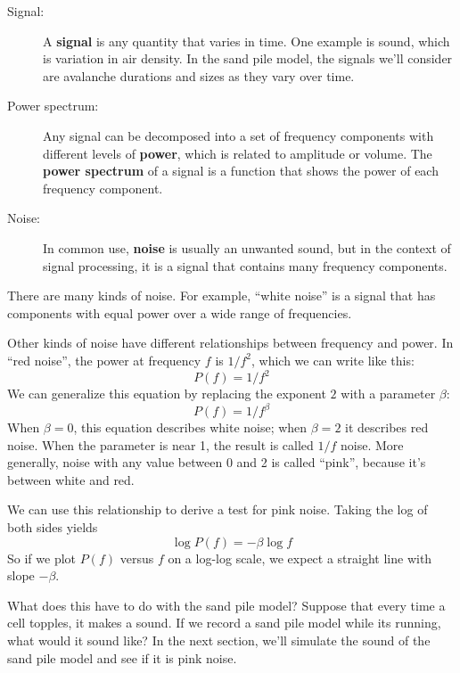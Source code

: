 \documentclass[12pt]{book}
\theoremstyle{exercise}
\begin{document}
\begin{description}

\item[Signal:] A {\bf signal} is any quantity that varies in time.
  One example is sound, which is variation in air density.  In the sand pile model, the signals we'll consider are avalanche durations and sizes as they vary over time.

\item[Power spectrum:] Any signal can be decomposed into a set of frequency components with different levels of {\bf power}, which is related to amplitude or volume.  The {\bf power spectrum} of a signal is a function that shows the power of each frequency component.

\item[Noise:] In common use, {\bf noise} is usually an unwanted sound,
but in the context of signal processing, it is a signal that
contains many frequency components.

\end{description}

There are many kinds of noise.  For example, ``white noise'' is a
signal that has components with equal power over a wide range of
frequencies.


Other kinds of noise have different relationships between frequency
and power.  In ``red noise'', the power at frequency $f$ is
$1/f^2$, which we can write like this:
%
\[ P(f) = 1/f^2 \]
%
We can generalize this equation by replacing the exponent $2$ with
a parameter $\beta$:
%
\[ P(f) = 1/f^\beta \]
%
When $\beta=0$, this equation describes white noise; when $\beta=2$ it
describes red noise.  When the parameter is near 1, the result is called
$1/f$ noise.  More generally, noise with any value between 0 and 2
is called ``pink'', because it's between white and red.


We can use this relationship to derive a test for pink noise.
Taking the log of both sides yields
%
\[ \log P(f) = -\beta \log f \]
%
So if we plot $P(f)$ versus $f$ on a log-log scale, we
expect a straight line with slope $-\beta$.

What does this have to do with the sand pile model?  Suppose that every time
a cell topples, it makes a sound.  If we record a sand pile model
while its running, what would it sound like?  In the next section, we'll simulate the sound of the sand pile model and see if it is pink noise.
\end{document}
